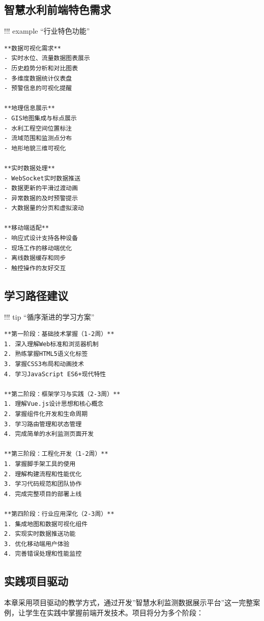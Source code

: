 \subsection{智慧水利前端特色需求}\label{ux667aux6167ux6c34ux5229ux524dux7aefux7279ux8272ux9700ux6c42}

!!! example ``行业特色功能''

\begin{verbatim}
**数据可视化需求**
- 实时水位、流量数据图表展示
- 历史趋势分析和对比图表
- 多维度数据统计仪表盘
- 预警信息的可视化提醒

**地理信息展示**
- GIS地图集成与标点展示
- 水利工程空间位置标注
- 流域范围和监测点分布
- 地形地貌三维可视化

**实时数据处理**
- WebSocket实时数据推送
- 数据更新的平滑过渡动画
- 异常数据的及时预警提示
- 大数据量的分页和虚拟滚动

**移动端适配**
- 响应式设计支持各种设备
- 现场工作的移动端优化
- 离线数据缓存和同步
- 触控操作的友好交互
\end{verbatim}

\subsection{学习路径建议}\label{ux5b66ux4e60ux8defux5f84ux5efaux8bae}

!!! tip ``循序渐进的学习方案''

\begin{verbatim}
**第一阶段：基础技术掌握（1-2周）**
1. 深入理解Web标准和浏览器机制
2. 熟练掌握HTML5语义化标签
3. 掌握CSS3布局和动画技术
4. 学习JavaScript ES6+现代特性

**第二阶段：框架学习与实践（2-3周）**
1. 理解Vue.js设计思想和核心概念
2. 掌握组件化开发和生命周期
3. 学习路由管理和状态管理
4. 完成简单的水利监测页面开发

**第三阶段：工程化开发（1-2周）**
1. 掌握脚手架工具的使用
2. 理解构建流程和性能优化
3. 学习代码规范和团队协作
4. 完成完整项目的部署上线

**第四阶段：行业应用深化（2-3周）**
1. 集成地图和数据可视化组件
2. 实现实时数据推送功能
3. 优化移动端用户体验
4. 完善错误处理和性能监控
\end{verbatim}

\subsection{实践项目驱动}\label{ux5b9eux8df5ux9879ux76eeux9a71ux52a8}

本章采用项目驱动的教学方式，通过开发''智慧水利监测数据展示平台''这一完整案例，让学生在实践中掌握前端开发技术。项目将分为多个阶段：

